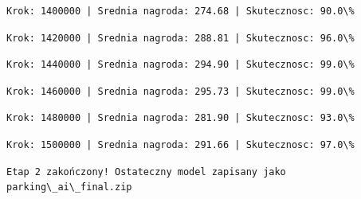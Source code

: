 \documentclass[11pt]{article}
\begin{document}
    
    
    \begin{Verbatim}[commandchars=\\\{\}]
Krok: 1400000 | Srednia nagroda: 274.68 | Skutecznosc: 90.0\%

    \end{Verbatim}

    
    
    \begin{Verbatim}[commandchars=\\\{\}]
Krok: 1420000 | Srednia nagroda: 288.81 | Skutecznosc: 96.0\%

    \end{Verbatim}

    
    
    \begin{Verbatim}[commandchars=\\\{\}]
Krok: 1440000 | Srednia nagroda: 294.90 | Skutecznosc: 99.0\%

    \end{Verbatim}

    
    
    \begin{Verbatim}[commandchars=\\\{\}]
Krok: 1460000 | Srednia nagroda: 295.73 | Skutecznosc: 99.0\%

    \end{Verbatim}

    
    
    \begin{Verbatim}[commandchars=\\\{\}]
Krok: 1480000 | Srednia nagroda: 281.90 | Skutecznosc: 93.0\%

    \end{Verbatim}

    
    
    \begin{Verbatim}[commandchars=\\\{\}]
Krok: 1500000 | Srednia nagroda: 291.66 | Skutecznosc: 97.0\%

    \end{Verbatim}

    
    
    \begin{Verbatim}[commandchars=\\\{\}]
Etap 2 zakończony! Ostateczny model zapisany jako parking\_ai\_final.zip

    \end{Verbatim}
\end{document}
